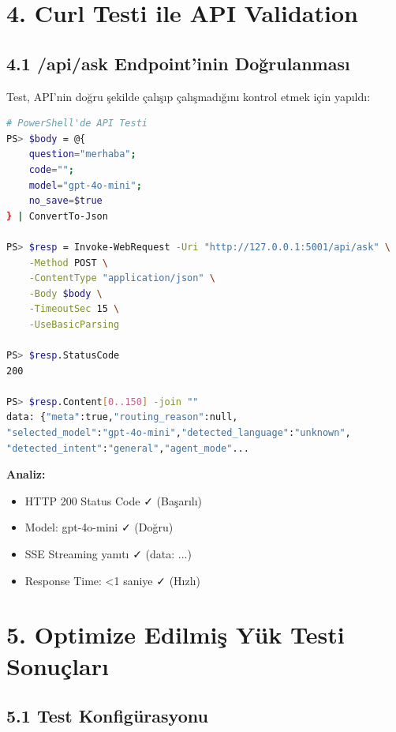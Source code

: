 \documentclass[12pt,a4paper]{report}
\begin{document}
\newpage

\section{4. Curl Testi ile API Validation}

\subsection{4.1 /api/ask Endpoint'inin Doğrulanması}

Test, API'nin doğru şekilde çalışıp çalışmadığını kontrol etmek için yapıldı:

\begin{lstlisting}[language=bash]
# PowerShell'de API Testi
PS> $body = @{
    question="merhaba";
    code="";
    model="gpt-4o-mini";
    no_save=$true
} | ConvertTo-Json

PS> $resp = Invoke-WebRequest -Uri "http://127.0.0.1:5001/api/ask" \
    -Method POST \
    -ContentType "application/json" \
    -Body $body \
    -TimeoutSec 15 \
    -UseBasicParsing

PS> $resp.StatusCode
200

PS> $resp.Content[0..150] -join ""
data: {"meta":true,"routing_reason":null,
"selected_model":"gpt-4o-mini","detected_language":"unknown",
"detected_intent":"general","agent_mode"...
\end{lstlisting}

\textbf{Analiz:}
\begin{itemize}
    \item HTTP 200 Status Code ✓ (Başarılı)
    \item Model: gpt-4o-mini ✓ (Doğru)
    \item SSE Streaming yanıtı ✓ (data: {...})
    \item Response Time: <1 saniye ✓ (Hızlı)
\end{itemize}

\newpage

\section{5. Optimize Edilmiş Yük Testi Sonuçları}

\subsection{5.1 Test Konfigürasyonu}
\end{document}
